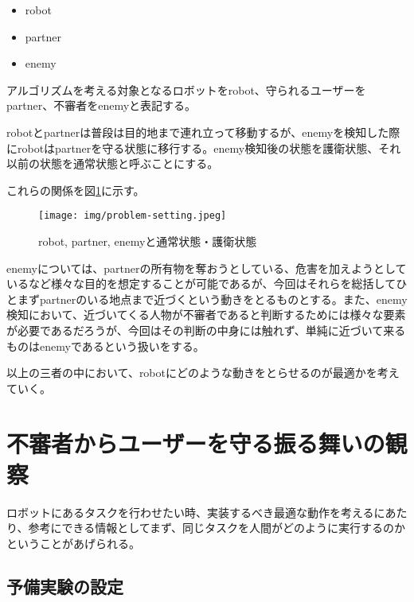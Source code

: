 \documentclass{kuisthesis}
\begin{document}
\begin{itemize}
	\item robot
	\item partner
	\item enemy
\end{itemize}

アルゴリズムを考える対象となるロボットをrobot、守られるユーザーをpartner、不審者をenemyと表記する。

robotとpartnerは普段は目的地まで連れ立って移動するが、enemyを検知した際にrobotはpartnerを守る状態に移行する。enemy検知後の状態を護衛状態、それ以前の状態を通常状態と呼ぶことにする。

これらの関係を図\ref{fig:problem-setting}に示す。

\begin{figure}[h]\begin{center}
	\texttt{[image: img/problem-setting.jpeg]}
	\caption{robot, partner, enemyと通常状態・護衛状態}
	\label{fig:problem-setting}
\end{center}\end{figure}

enemyについては、partnerの所有物を奪おうとしている、危害を加えようとしているなど様々な目的を想定することが可能であるが、今回はそれらを総括してひとまずpartnerのいる地点まで近づくという動きをとるものとする。また、enemy検知において、近づいてくる人物が不審者であると判断するためには様々な要素が必要であるだろうが、今回はその判断の中身には触れず、単純に近づいて来るものはenemyであるという扱いをする。

以上の三者の中において、robotにどのような動きをとらせるのが最適かを考えていく。






\section{不審者からユーザーを守る振る舞いの観察}

ロボットにあるタスクを行わせたい時、実装するべき最適な動作を考えるにあたり、参考にできる情報としてまず、同じタスクを人間がどのように実行するのかということがあげられる。

\subsection{予備実験の設定}
\end{document}
